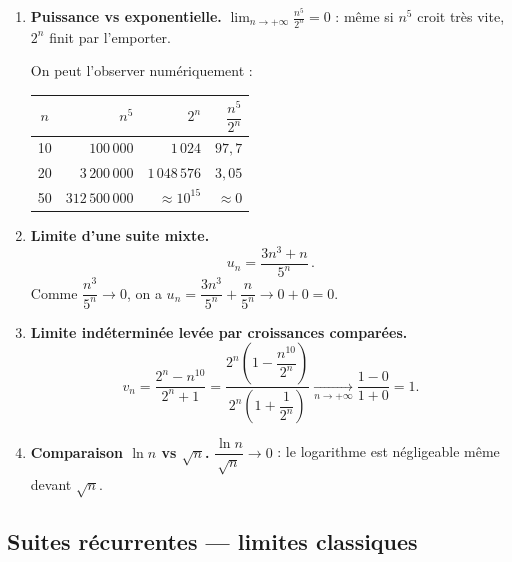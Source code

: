 \documentclass[11pt,a4paper,openany]{book}
\theoremstyle{definition}
\begin{document}
    \begin{Exemple}
    \begin{enumerate}
        \item \textbf{Puissance vs exponentielle.}
              $\displaystyle\lim_{n\to+\infty}\frac{n^5}{2^n}=0$ :
              même si $n^5$ croit très vite, $2^n$ finit par l'emporter.

              \medskip
              On peut l'observer numériquement :
              \begin{center}
              \begin{tabular}{|c|r|r|r|}
                  \hline
                  $n$ & $n^5$ & $2^n$ & $\dfrac{n^5}{2^n}$ \\
                  \hline
                  10  & $100\,000$        & $1\,024$           & $97{,}7$ \\
                  20  & $3\,200\,000$     & $1\,048\,576$      & $3{,}05$ \\
                  50  & $312\,500\,000$   & $\approx 10^{15}$  & $\approx 0$ \\
                  \hline
              \end{tabular}
              \end{center}

        \item \textbf{Limite d'une suite mixte.}
              \[
                  u_n=\frac{3n^3+n}{5^n}\,.
              \]
              Comme $\dfrac{n^3}{5^n}\to 0$, on a
              $u_n=\dfrac{3n^3}{5^n}+\dfrac{n}{5^n}\to 0+0=0$.

        \item \textbf{Limite indéterminée levée par croissances comparées.}
              \[
                  v_n=\frac{2^n-n^{10}}{2^n+1}
                  =\frac{2^n\!\left(1-\dfrac{n^{10}}{2^n}\right)}
                        {2^n\!\left(1+\dfrac{1}{2^n}\right)}
                  \xrightarrow[n\to+\infty]{}\frac{1-0}{1+0}=1.
              \]

        \item \textbf{Comparaison $\ln n$ vs $\sqrt{n}$.}
              $\dfrac{\ln n}{\sqrt{n}}\to 0$ : le logarithme est négligeable
              même devant $\sqrt{n}$.
    \end{enumerate}
    \end{Exemple}

    \subsection{Suites récurrentes --- limites classiques}
\end{document}
